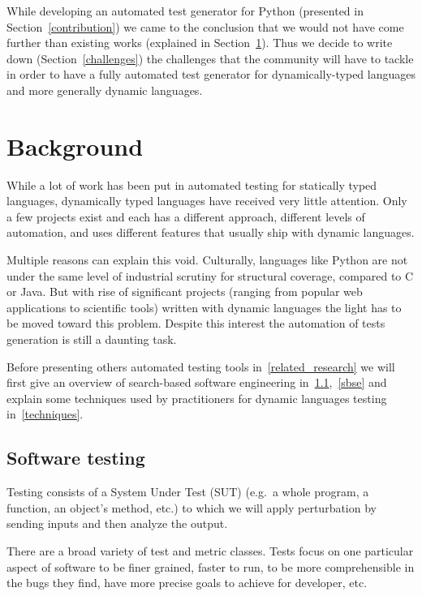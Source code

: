 \documentclass{llncs2e/llncs}
\begin{document}
While developing an automated test generator for Python (presented in
Section~\ref{contribution}) we came to the conclusion that we would not have
come further than existing works (explained in Section~\ref{relatedwork}). Thus
we decide to write down (Section~\ref{challenges}) the challenges that the
community will have to tackle in order to have a fully automated test generator
for dynamically-typed languages and more generally dynamic languages.


\section{Background}
\label{relatedwork}

While a lot of work has been put in automated testing for statically typed
languages, dynamically typed languages have received very little attention. Only
a few projects exist and each has a different approach, different levels of
automation, and uses different features that usually ship with dynamic
languages.

Multiple reasons can explain this void. Culturally, languages like Python are
not under the same level of industrial scrutiny for structural coverage,
compared to C or Java. But with rise of significant projects (ranging from
popular web applications to scientific tools) written with dynamic languages the
light has to be moved toward this problem.  Despite this interest the automation
of tests generation is still a daunting task.

Before presenting others automated testing tools in~\ref{related_research} we
will first give an overview of search-based software engineering in~\ref{st},~\ref{sbse}
and explain some techniques used by practitioners for dynamic languages testing
in~\ref{techniques}.

\subsection{Software testing}
\label{st}

Testing consists of a System Under Test (SUT) (e.g.\ a whole program, a
function, an object's method, etc.) to which we will apply perturbation by
sending inputs and then analyze the output.

There are a broad variety of test and metric classes. Tests focus on one
particular aspect of software to be finer grained, faster to run, to be more
comprehensible in the bugs they find, have more precise goals to achieve for
developer, etc.
\end{document}
